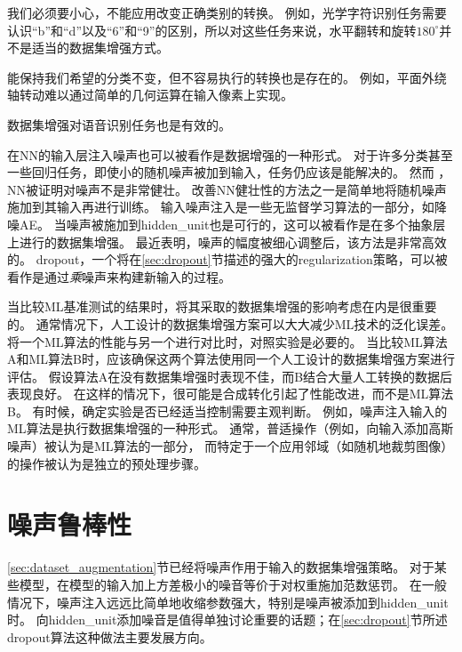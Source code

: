 我们必须要小心，不能应用改变正确类别的转换。
例如，光学字符识别任务需要认识``b''和``d''以及``6''和``9''的区别，所以对这些任务来说，水平翻转和旋转$180^{\circ}$并不是适当的数据集增强方式。


能保持我们希望的分类不变，但不容易执行的转换也是存在的。
例如，平面外绕轴转动难以通过简单的几何运算在输入像素上实现。

数据集增强对语音识别任务也是有效的\citep{Jaitly_VTLP_2013}。

在\gls{NN}的输入层注入噪声\citep{SietsmaDow91}也可以被看作是数据增强的一种形式。
对于许多分类甚至一些回归任务，即使小的随机噪声被加到输入，任务仍应该是能解决的。
然而 ，\gls{NN}被证明对噪声不是非常健壮\citep{TangElias10}。
改善\gls{NN}健壮性的方法之一是简单地将随机噪声施加到其输入再进行训练。
输入噪声注入是一些无监督学习算法的一部分，如降噪\gls{AE}\citep{VincentPLarochelleH2008}。
当噪声被施加到\gls{hidden_unit}也是可行的，这可以被看作是在多个抽象层上进行的数据集增强。
\cite{Poole14}最近表明，噪声的幅度被细心调整后，该方法是非常高效的。
\gls{dropout}，一个将在\ref{sec:dropout}节描述的强大的\gls{regularization}策略，可以被看作是通过\emph{乘}噪声来构建新输入的过程。

当比较\gls{ML}基准测试的结果时，将其采取的数据集增强的影响考虑在内是很重要的。
通常情况下，人工设计的数据集增强方案可以大大减少\gls{ML}技术的泛化误差。
将一个\gls{ML}算法的性能与另一个进行对比时，对照实验是必要的。
当比较\gls{ML}算法A和\gls{ML}算法B时，应该确保这两个算法使用同一个人工设计的数据集增强方案进行评估。
假设算法A在没有数据集增强时表现不佳，而B结合大量人工转换的数据后表现良好。
在这样的情况下，很可能是合成转化引起了性能改进，而不是\gls{ML}算法B。 
有时候，确定实验是否已经适当控制需要主观判断。
例如，噪声注入输入的\gls{ML}算法是执行数据集增强的一种形式。
通常，普适操作（例如，向输入添加高斯噪声）被认为是\gls{ML}算法的一部分，
而特定于一个应用邻域（如随机地裁剪图像）的操作被认为是独立的预处理步骤。


\section{噪声鲁棒性}
\label{sec:noise_robustness}

\ref{sec:dataset_augmentation}节已经将噪声作用于输入的数据集增强策略。
对于某些模型，在模型的输入加上方差极小的噪音等价于对权重施加范数惩罚\citep{Bishop1995,bishop95training}。
在一般情况下，噪声注入远远比简单地收缩参数强大，特别是噪声被添加到\gls{hidden_unit}时。
向\gls{hidden_unit}添加噪音是值得单独讨论重要的话题；在\ref{sec:dropout}节所述\gls{dropout}算法这种做法主要发展方向。

